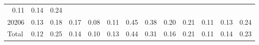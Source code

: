 \begin{table}[!h]
\begin{tabular}{lllllllllllll}
  \multicolumn{1}{r}{0.11} &
  \multicolumn{1}{r}{0.14} &
  \multicolumn{1}{r}{0.24} \\
\multicolumn{1}{l}{\hspace{1em}20206} &
  \multicolumn{1}{|r}{0.13} &
  \multicolumn{1}{r}{0.18} &
  \multicolumn{1}{r}{0.17} &
  \multicolumn{1}{r}{0.08} &
  \multicolumn{1}{r}{0.11} &
  \multicolumn{1}{r}{0.45} &
  \multicolumn{1}{r}{0.38} &
  \multicolumn{1}{r}{0.20} &
  \multicolumn{1}{r}{0.21} &
  \multicolumn{1}{r}{0.11} &
  \multicolumn{1}{r}{0.13} &
  \multicolumn{1}{r}{0.24} \\
\multicolumn{1}{l}{\hspace{1em}Total} &
  \multicolumn{1}{|r}{0.12} &
  \multicolumn{1}{r}{0.25} &
  \multicolumn{1}{r}{0.14} &
  \multicolumn{1}{r}{0.10} &
  \multicolumn{1}{r}{0.13} &
  \multicolumn{1}{r}{0.44} &
  \multicolumn{1}{r}{0.31} &
  \multicolumn{1}{r}{0.16} &
  \multicolumn{1}{r}{0.21} &
  \multicolumn{1}{r}{0.11} &
  \multicolumn{1}{r}{0.14} &
  \multicolumn{1}{r}{0.23} \\
\cline{1-13}
\end{tabular}
\end{table}
